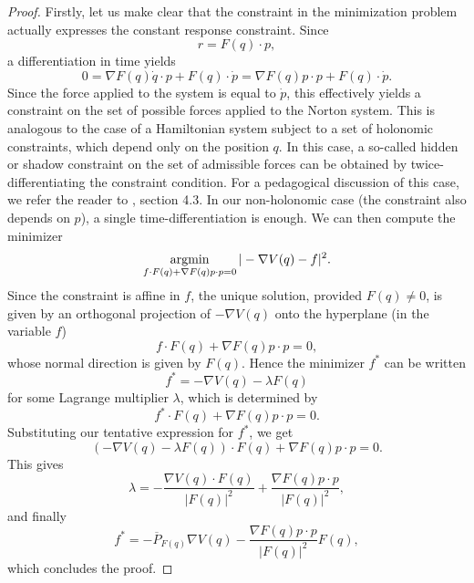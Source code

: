 \begin{proof}
    Firstly, let us make clear that the constraint in the minimization problem actually expresses the constant response constraint.
    Since \[r =F(q)\cdot p,\]
    a differentiation in time yields 
    \begin{equation}
        \label{eq:hidden_constraint}
        0=\nabla F(q)\dot{q}\cdot p + F(q) \cdot \dot{p}=\nabla F(q)p\cdot p +F(q)\cdot \dot{p}.
    \end{equation}
    Since the force applied to the system is equal to $\dot{p}$, this effectively yields a constraint on the set of possible forces applied to the Norton system.
    This is analogous to the case of a Hamiltonian system subject to a set of holonomic constraints, which depend only on the position $q$. 
    In this case, a so-called hidden or shadow constraint on the set of admissible forces can be obtained by twice-differentiating the constraint condition. 
    For a pedagogical discussion of this case, we refer the reader to \cite{LM15}, section 4.3.
    In our non-holonomic case (the constraint also depends on $p$), a single time-differentiation is enough.
    We can then compute the minimizer 
    \begin{equation}
        \underset{f\cdot F(q)+\nabla F(q)p\cdot p =0}{\operatorname*{argmin}}\,|-\nabla V(q)-f|^2.
    \end{equation}
    Since the constraint is affine in $f$, the unique solution, provided $F(q)\neq 0$, is given by an orthogonal projection of $-\nabla V(q)$ onto the hyperplane (in the variable $f$)
    \[f \cdot F(q) +\nabla F(q)p\cdot p=0,\]
    whose normal direction is given by $F(q)$. Hence the minimizer $f^*$ can be written 
    \begin{equation}
        \label{eq:f_star_minimizer}
        f^*=-\nabla V(q) -\lambda F(q)
    \end{equation}
    for some Lagrange multiplier $\lambda$, which is determined by 
    \[f^* \cdot F(q) +\nabla F(q)p\cdot p=0.\]
    Substituting our tentative expression for $f^*$, we get 
    \[\left(-\nabla V(q) - \lambda F(q)\right)\cdot F(q)+\nabla F(q)p\cdot p=0.\]
    This gives 
    \begin{equation}
        \label{eq:lambda_gpolc_expression}
        \lambda=-\frac{\nabla V(q)\cdot F(q)}{|F(q)|^2}+\frac{\nabla F(q)p\cdot p}{|F(q)|^2},
    \end{equation}
    and finally 
    \[f^* = -\overline{P}_{F(q)} \nabla V(q) -\frac{\nabla F(q)p\cdot p}{|F(q)|^2}F(q),\]
    which concludes the proof.
\end{proof}
